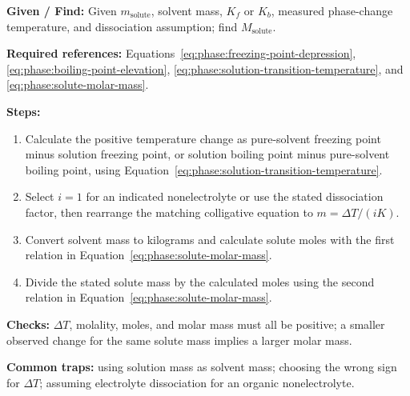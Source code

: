\textbf{Given / Find:} Given \(m_{\mathrm{solute}}\), solvent mass, \(K_f\) or \(K_b\), measured phase-change temperature, and dissociation assumption; find \(M_{\mathrm{solute}}\).

\textbf{Required references:} Equations~\ref{eq:phase:freezing-point-depression}, \ref{eq:phase:boiling-point-elevation}, \ref{eq:phase:solution-transition-temperature}, and \ref{eq:phase:solute-molar-mass}.


\textbf{Steps:}
\begin{enumerate}
    \item Calculate the positive temperature change as pure-solvent freezing point minus solution freezing point, or solution boiling point minus pure-solvent boiling point, using Equation~\ref{eq:phase:solution-transition-temperature}.
    \item Select \(i=1\) for an indicated nonelectrolyte or use the stated dissociation factor, then rearrange the matching colligative equation to \(m=\Delta T/(iK)\).
    \item Convert solvent mass to kilograms and calculate solute moles with the first relation in Equation~\ref{eq:phase:solute-molar-mass}.
    \item Divide the stated solute mass by the calculated moles using the second relation in Equation~\ref{eq:phase:solute-molar-mass}.
\end{enumerate}

\textbf{Checks:} \(\Delta T\), molality, moles, and molar mass must all be positive; a smaller observed change for the same solute mass implies a larger molar mass.

\textbf{Common traps:} using solution mass as solvent mass; choosing the wrong sign for \(\Delta T\); assuming electrolyte dissociation for an organic nonelectrolyte.

